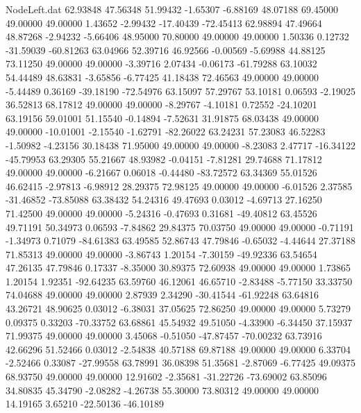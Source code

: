 \begin{filecontents}{NodeLeft.dat}
  62.93848   47.56348   51.99432    -1.65307   -6.88169   48.07188   69.45000   49.00000   49.00000    1.43652   -2.99432  -17.40439  -72.45413
  62.98894   47.49664   48.87268    -2.94232   -5.66406   48.95000   70.80000   49.00000   49.00000    1.50336    0.12732  -31.59039  -60.81263
  63.04966   52.39716   46.92566    -0.00569   -5.69988   44.88125   73.11250   49.00000   49.00000   -3.39716    2.07434   -0.06173  -61.79288
  63.10032   54.44489   48.63831    -3.65856   -6.77425   41.18438   72.46563   49.00000   49.00000   -5.44489    0.36169  -39.18190  -72.54976
  63.15097   57.29767   53.10181     0.06593   -2.19025   36.52813   68.17812   49.00000   49.00000   -8.29767   -4.10181    0.72552  -24.10201
  63.19156   59.01001   51.15540    -0.14894   -7.52631   31.91875   68.03438   49.00000   49.00000  -10.01001   -2.15540   -1.62791  -82.26022
  63.24231   57.23083   46.52283    -1.50982   -4.23156   30.18438   71.95000   49.00000   49.00000   -8.23083    2.47717  -16.34122  -45.79953
  63.29305   55.21667   48.93982    -0.04151   -7.81281   29.74688   71.17812   49.00000   49.00000   -6.21667    0.06018   -0.44480  -83.72572
  63.34369   55.01526   46.62415    -2.97813   -6.98912   28.29375   72.98125   49.00000   49.00000   -6.01526    2.37585  -31.46852  -73.85088
  63.38432   54.24316   49.47693     0.03012   -4.69713   27.16250   71.42500   49.00000   49.00000   -5.24316   -0.47693    0.31681  -49.40812
  63.45526   49.71191   50.34973     0.06593   -7.84862   29.84375   70.03750   49.00000   49.00000   -0.71191   -1.34973    0.71079  -84.61383
  63.49585   52.86743   47.79846    -0.65032   -4.44644   27.37188   71.85313   49.00000   49.00000   -3.86743    1.20154   -7.30159  -49.92336
  63.54654   47.26135   47.79846     0.17337   -8.35000   30.89375   72.60938   49.00000   49.00000    1.73865    1.20154    1.92351  -92.64235
  63.59760   46.12061   46.65710    -2.83488   -5.77150   33.33750   74.04688   49.00000   49.00000    2.87939    2.34290  -30.41544  -61.92248
  63.64816   43.26721   48.90625     0.03012   -6.38031   37.05625   72.86250   49.00000   49.00000    5.73279    0.09375    0.33203  -70.33752
  63.68861   45.54932   49.51050    -4.33900   -6.34450   37.15937   71.99375   49.00000   49.00000    3.45068   -0.51050  -47.87457  -70.00232
  63.73916   42.66296   51.52466     0.03012   -2.54838   40.57188   69.87188   49.00000   49.00000    6.33704   -2.52466    0.33087  -27.99558
  63.78991   36.08398   51.35681    -2.87069   -6.77425   49.09375   68.93750   49.00000   49.00000   12.91602   -2.35681  -31.22726  -73.69002
  63.85096   34.80835   45.34790    -2.08282   -4.26738   55.30000   73.80312   49.00000   49.00000   14.19165    3.65210  -22.50136  -46.10189

\end{filecontents}
